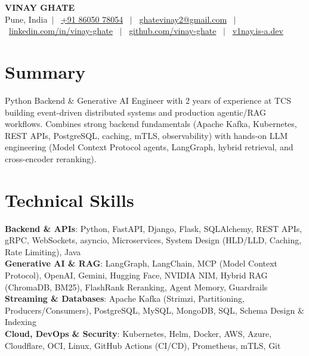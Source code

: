\documentclass[a4paper,10.5pt]{article}
\makeatletter
\newcommand{\fullName}{Vinay Ghate}
\newcommand{\cityCountry}{Pune, India}
\newcommand{\phoneNumber}{+91 86050 78054}
\newcommand{\emailAddr}{ghatevinay2@gmail.com}
\newcommand{\linkedinUrl}{https://www.linkedin.com/in/vinay-ghate}
\newcommand{\githubUrl}{https://github.com/vinay-ghate}
\newcommand{\portfolioUrl}{https://v1nay.is-a.dev}
\makeatother
\begin{document}
\begin{center}
  {\fontsize{24}{28}\selectfont\bfseries \MakeUppercase{\fullName}} \\[4pt]
  \small
  \cityCountry \ $|$ \
  \href{tel:+918605078054}{\phoneNumber} \ $|$ \
  \href{mailto:\emailAddr}{\emailAddr} \ $|$ \
  \href{\linkedinUrl}{linkedin.com/in/vinay-ghate} \ $|$ \
  \href{\githubUrl}{github.com/vinay-ghate} \ $|$ \
  \href{\portfolioUrl}{v1nay.is-a.dev}
\end{center}
\vspace{-8pt}

\section{Summary}
\small{
  Python Backend \& Generative AI Engineer with 2 years of experience at TCS building event-driven distributed systems and production agentic/RAG workflows. Combines strong backend fundamentals (Apache Kafka, Kubernetes, REST APIs, PostgreSQL, caching, mTLS, observability) with hands-on LLM engineering (Model Context Protocol agents, LangGraph, hybrid retrieval, and cross-encoder reranking).
}

\section{Technical Skills}
\begin{itemize}[leftmargin=0.12in, label={}]
  \small{\item{
    \textbf{Backend \& APIs}{: Python, FastAPI, Django, Flask, SQLAlchemy, REST APIs, gRPC, WebSockets, asyncio, Microservices, System Design (HLD/LLD, Caching, Rate Limiting), Java} \\
    \textbf{Generative AI \& RAG}{: LangGraph, LangChain, MCP (Model Context Protocol), OpenAI, Gemini, Hugging Face, NVIDIA NIM, Hybrid RAG (ChromaDB, BM25), FlashRank Reranking, Agent Memory, Guardrails} \\
    \textbf{Streaming \& Databases}{: Apache Kafka (Strimzi, Partitioning, Producers/Consumers), PostgreSQL, MySQL, MongoDB, SQL, Schema Design \& Indexing} \\
    \textbf{Cloud, DevOps \& Security}{: Kubernetes, Helm, Docker, AWS, Azure, Cloudflare, OCI, Linux, GitHub Actions (CI/CD), Prometheus, mTLS, Git}
  }}
\end{itemize}

\end{document}
